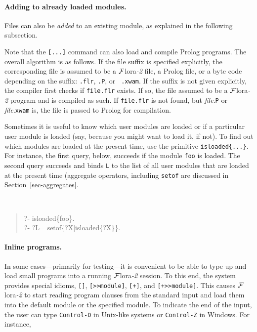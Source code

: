\documentclass[11pt]{article}
\newcommand{\FLSYSTEM}{{\mbox{\sc ${\cal F}${lora}\rm\emph{-2}}}\xspace}
\newcommand{\flrext}{flr}
\newcommand{\ofile}{xwam}
\begin{document}
\paragraph{Adding to already loaded modules.}
Files can also be \emph{added} to an existing module, as explained in the
following subsection. 

Note that the {\tt [...]} command can also load and compile Prolog programs.
The overall algorithm is as follows. If the file suffix is specified
explicitly, the corresponding file is assumed to be a \FLSYSTEM file, a Prolog
file, or a byte code depending on the suffix: {\tt .\flrext}, {\tt .P}, or {\tt
  .\ofile}. If the suffix is not given explicitly, the compiler first checks if
\texttt{file.\flrext}  exists. If so, the file assumed to be a \FLSYSTEM program
and is compiled as such. If \texttt{file.\flrext}  is not found, but {\it
  file}.{\tt P} or {\it file}.{\tt xwam} is, the file is passed to Prolog for
compilation.


Sometimes it is useful to know which user modules are loaded or if a
particular user module is loaded (say, because you might want to load it,
if not).  To find out which modules are loaded at the present time, use the
primitive {\tt isloaded\{...\}}. For instance, the first query,
below, succeeds if the module {\tt foo} is loaded. The second query
succeeds and binds {\tt L} to the list of all user modules that are loaded
at the present time (aggregate operators, including {\tt setof} are
discussed in Section~\ref{sec-aggregates}.
{\tt
\begin{quote}
 ?- isloaded\{foo\}.\\
 ?- ?L= setof\{?X|isloaded\{?X\}\}.
\end{quote}
}

\paragraph{Inline programs.}
In some cases---primarily for testing---it is convenient to be able to type
up and load small programs into a running \FLSYSTEM session.
To this end, the system provides special idioms, \verb|[]|,
\verb|[>>module]|, \verb|[+]|, and \verb|[+>>module]|. This causes \FLSYSTEM to start reading program clauses
from the standard input and load them into the default module or the
specified module. To indicate the end of the input, the user can type
{\tt Control-D} in Unix-like systems or {\tt Control-Z} in Windows.  
For instance,
\end{document}
